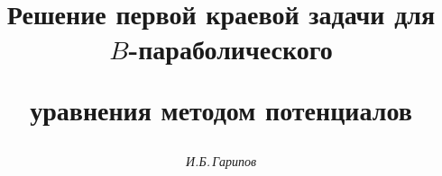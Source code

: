 

 




\newcommand{\tts}[1]{} 


\renewcommand{\baselinestretch}{1.15}


 




 


\setcounter{page}{60} 












 


\author{\it И.Б.\,Гарипов} 




\title{Решение первой краевой задачи для $B$-параболического 


уравнения методом потенциалов} 


\date{} 




\pagestyle{plain} %


 




\maketitle 


\label{begin} 


